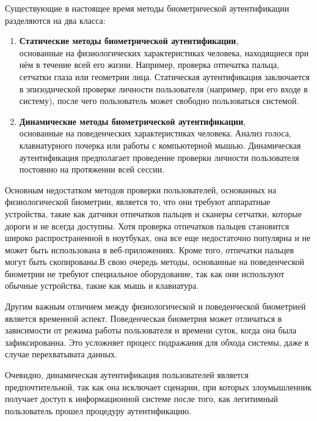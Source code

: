 \documentclass[12pt]{article}
\begin{document}
    \par Существующие в настоящее время методы биометрической аутентификации разделяются на два класса:
    \begin{enumerate}
        \item \textbf{Статические методы биометрической аутентификации}, \\
        основанные на физиологических характеристиках человека, находящиеся при нём в течение всей его жизни. Например, проверка отпечатка пальца, сетчатки глаза или геометрии лица. Статическая аутентификация заключается в эпизодической проверке личности пользователя (например, при его входе в систему), после чего пользователь может свободно пользоваться системой.
        \item \textbf{Динамические методы биометрической аутентификации}, \\
        основанные на поведенческих характеристиках человека. Анализ голоса, клавиатурного почерка или работы с компьютерной мышью. Динамическая аутентификация предполагает проведение проверки личности пользователя постоянно на протяжении всей сессии.
    \end{enumerate}

    \par Основным недостатком методов проверки пользователей, основанных на физиологической биометрии, является то, что они требуют аппаратные устройства, такие как датчики отпечатков пальцев и сканеры сетчатки, которые дороги и не всегда доступны. Хотя проверка отпечатков пальцев становится широко распространенной в ноутбуках, она все еще недостаточно популярна и не может быть использована в веб-приложениях. Кроме того, отпечатки пальцев могут быть скопированы.В свою очередь методы, основанные на поведенческой биометрии не требуют специальное оборудование, так как они используют обычные устройства, такие как мышь и клавиатура. \\
    \par Другим важным отличием между физиологической и поведенческой биометрией является временной аспект. Поведенческая биометрия может отличаться в зависимости от режима работы пользователя и времени суток, когда она была зафиксированна. Это усложняет процесс подражания для обхода системы, даже в случае перехватывата данных.\\

    \par Очевидно, динамическая аутентификация пользователей является предпочтительной, так как она исключает сценарии, при которых злоумышленник получает доступ к информационной системе после того, как легитимный пользователь прошел процедуру аутентификацию.
\end{document}
